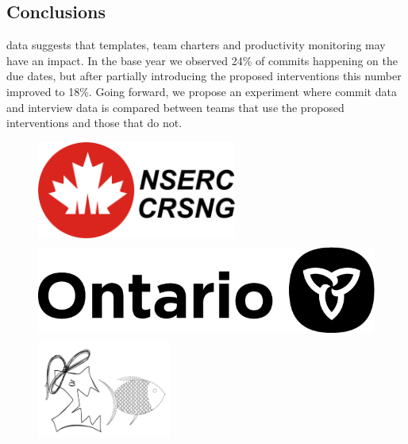 \documentclass[poster, a0, plainboxedsections]{sciposter}
\begin{document}
\begin{multicols}{2}
\section{Conclusions}

 data suggests that templates, team charters and
productivity monitoring may have an impact.  In the base year we observed 24\%
of commits happening on the due dates, but after partially introducing the
proposed interventions this number improved to 18\%.  Going forward, we propose
an experiment where commit data and interview data is compared between teams
that use the proposed interventions and those that do not.

\begin{figure}[htbp]
  \centering
  \includegraphics[height=3.2cm,trim={0 0 28.5cm 0},clip]{nserc-logo.jpg}
  \hspace{0.5cm}
  \includegraphics[height=3.2cm,trim={16.5cm 0 0 0},clip]{ontario@2x-print.png}
  \hspace{0.5cm}
  \includegraphics[height=3.2cm,trim={0 0.5cm 0 0.48cm},clip]{outreachlogo.png}  
\end{figure}


\end{multicols}
\end{document}
